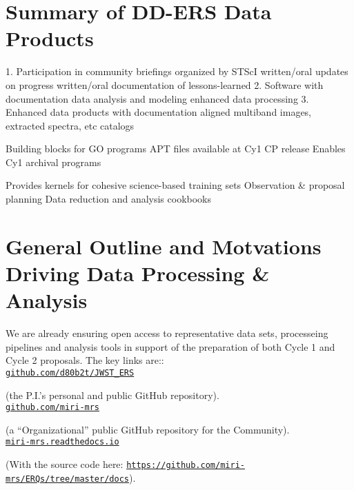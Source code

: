 \section*{Summary of DD-ERS Data Products}

1.	Participation in community briefings organized by STScI
written/oral updates on progress
written/oral documentation of lessons-learned
2.	Software with documentation
data analysis and modeling
enhanced data processing
3.	Enhanced data products with documentation
aligned multiband images, extracted spectra, etc
catalogs

Building blocks for GO programs 
APT files available at Cy1 CP release
Enables Cy1 archival programs

Provides kernels for cohesive science-based training sets 
Observation \& proposal planning
Data reduction and analysis cookbooks



\section*{General Outline and Motvations Driving Data Processing \& Analysis}
We are already ensuring open access to representative data sets, processeing pipelines and analysis tools in 
support of the preparation of both Cycle 1 and Cycle 2 proposals. 
The key links are:: \\ 

\href{https://github.com/d80b2t/JWST\_ERS}{{\tt github.com/d80b2t/JWST\_ERS}} 

(the P.I.'s personal and public GitHub repository).
\\

\href{https://github.com/miri-mrs}{{\tt github.com/miri-mrs}} 

(a ``Organizational'' public GitHub repository for the Community).
\\

\href{http://miri-mrs.readthedocs.io/en/latest/}{{\tt miri-mrs.readthedocs.io}}

(With the source code here: \href{https://github.com/miri-mrs/ERQs/tree/master/docs}{{\tt https://github.com/miri-mrs/ERQs/tree/master/docs}}). \\



